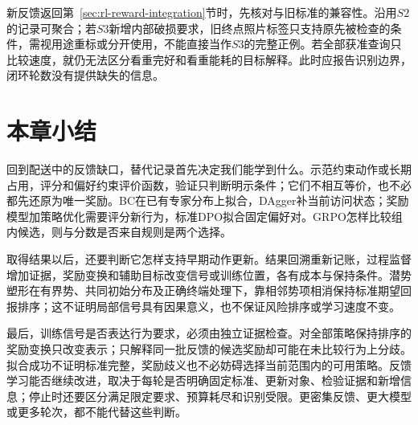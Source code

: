 新反馈返回第~\ref{sec:rl-reward-integration}节时，先核对与旧标准的兼容性。沿用$S2$的记录可聚合；若$S3$新增内部破损要求，旧终点照片标签只支持原先被检查的条件，需视用途重标或分开使用，不能直接当作$S3$的完整正例。若全部获准查询只比较速度，就仍无法区分看重完好和看重能耗的目标解释。此时应报告识别边界，闭环轮数没有提供缺失的信息。

\section{本章小结}
\label{sec:rl-reward-summary}

回到配送中的反馈缺口，替代记录首先决定我们能学到什么。示范约束动作或长期占用，评分和偏好约束评价函数，验证只判断明示条件；它们不相互等价，也不必都先还原为唯一奖励。BC在已有专家分布上拟合，DAgger补当前访问状态；奖励模型加策略优化需要评分新行为，标准DPO拟合固定偏好对。GRPO怎样比较组内候选，则与分数是否来自规则是两个选择。

取得结果以后，还要判断它怎样支持早期动作更新。结果回溯重新记账，过程监督增加证据，奖励变换和辅助目标改变信号或训练位置，各有成本与保持条件。潜势塑形在有界势、共同初始分布及正确终端处理下，靠相邻势项相消保持标准期望回报排序；这不证明局部信号具有因果意义，也不保证风险排序或学习速度不变。

最后，训练信号是否表达行为要求，必须由独立证据检查。对全部策略保持排序的奖励变换只改变表示；只解释同一批反馈的候选奖励却可能在未比较行为上分歧。拟合成功不证明标准完整，奖励歧义也不必妨碍选择当前范围内的可用策略。反馈学习能否继续改进，取决于每轮是否明确固定标准、更新对象、检验证据和新增信息；停止时还要区分满足限定要求、预算耗尽和识别受限。更密集反馈、更大模型或更多轮次，都不能代替这些判断。
